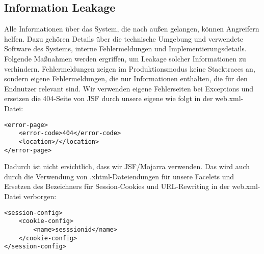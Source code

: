 \subsection{Information Leakage}\label{subsec:information-leakage}
Alle Informationen über das System, die nach außen gelangen, können Angreifern helfen.
Dazu gehören Details über die technische Umgebung und verwendete Software des Systems, interne Fehlermeldungen und Implementierungsdetails.
Folgende Maßnahmen werden ergriffen, um Leakage solcher Informationen zu verhindern.
Fehlermeldungen zeigen im Produktionsmodus keine Stacktraces an, sondern eigene Fehlermeldungen, die nur Informationen enthalten, die für den Endnutzer relevant sind.
Wir verwenden eigene Fehlerseiten bei Exceptions und ersetzen die 404-Seite von JSF durch unsere eigene wie folgt in der web.xml-Datei:
    {\small
\begin{lstlisting}
<error-page>
    <error-code>404</error-code>
    <location>/</location>
</error-page>
\end{lstlisting}
}
Dadurch ist nicht ersichtlich, dass wir JSF/Mojarra verwenden.
Das wird auch durch die Verwendung von .xhtml-Dateiendungen für unsere Facelets und Ersetzen des Bezeichners  für Session-Cookies und URL-Rewriting in der web.xml-Datei verborgen:
    {\small
\begin{lstlisting}
<session-config>
    <cookie-config>
        <name>sesssionid</name>
    </cookie-config>
</session-config>
\end{lstlisting}
}